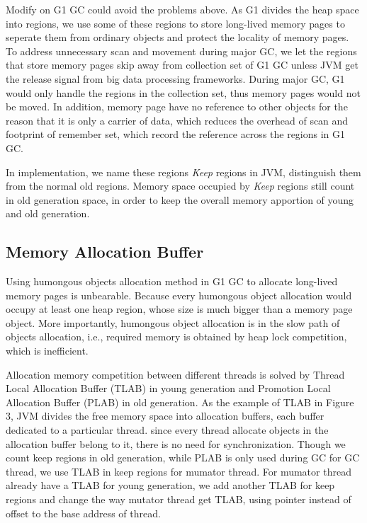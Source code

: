 \documentclass[sigplan, screen]{acmart}
\begin{document}
Modify on G1 GC could avoid the problems above. As G1 divides the heap space into regions, we use some of these regions to store long-lived memory pages to seperate 
them from ordinary objects and protect the locality of memory pages. To address unnecessary scan and movement during major GC, we let the regions that store
memory pages skip away from collection set of G1 GC unless JVM get the release signal from big data processing frameworks. During major GC, G1 would only handle the 
regions in the collection set, thus memory pages would not be moved. In addition, memory page have no reference to other objects for the reason that it is only a 
carrier of data, which reduces the overhead of scan and footprint of remember set, which record the reference across the regions in G1 GC. 

In implementation, we name these regions 
\emph{Keep} regions in JVM, distinguish them from the normal old regions. Memory space occupied by \emph{Keep} regions still count in old generation space, 
in order to keep the overall memory apportion of young and old generation.   

\subsection{Memory Allocation Buffer}
Using humongous objects allocation method in G1 GC to allocate long-lived memory pages is unbearable. Because every humongous object allocation would occupy
at least one heap region, whose size is much bigger than a memory page object. More importantly, humongous object allocation is in the slow path of objects allocation, i.e., 
required memory is obtained by heap lock competition, which is inefficient.

Allocation memory competition between different threads is solved by Thread Local Allocation Buffer (TLAB) in young generation and Promotion Local Allocation Buffer (PLAB)
in old generation. As the example of TLAB in Figure 3, JVM divides the free memory space into allocation buffers, each buffer dedicated to a particular thread. 
since every thread allocate objects in the allocation buffer belong to it, there is no need for synchronization. 
Though we count keep regions in old generation, while PLAB is only used during GC for GC thread, we use TLAB in keep
regions for mumator thread. For mumator thread already have a TLAB for young generation, we add another TLAB for keep regions and change the way mutator thread
get TLAB, using pointer instead of offset to the base address of thread.
\end{document}
